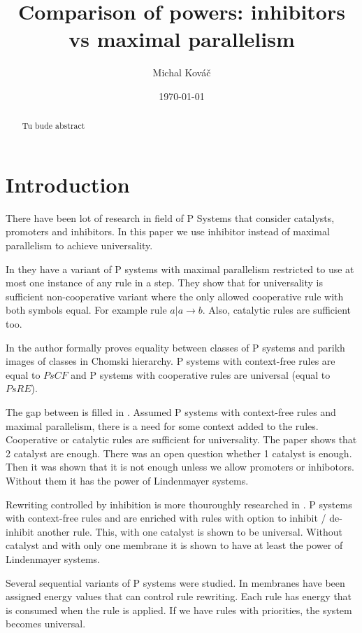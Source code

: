 \documentclass[a4paper,10pt]{article}
\begin{document}
\title{Comparison of powers: inhibitors vs maximal parallelism}
\author{Michal Kováč}
\date{\today}
\maketitle

\begin{abstract}
Tu bude abstract
\end{abstract}

\section{Introduction}
There have been lot of research in field of P Systems that consider catalysts, promoters and inhibitors. In this paper we use inhibitor instead of maximal parallelism to achieve universality.

In \cite{Ibarra04dang:the} they have a variant of P systems with maximal parallelism restricted to use at most one instance of any rule in a step.
They show that for universality is sufficient non-cooperative variant where the only allowed cooperative rule with both symbols equal. For example rule $a|a\rightarrow b$. Also, catalytic rules are sufficient too.

In \cite{Sburlan05dragos} the author formally proves equality between classes of P systems and parikh images of classes in Chomski hierarchy. P systems with context-free rules are equal to $PsCF$ and P systems with cooperative rules are universal (equal to $PsRE$).

The gap between is filled in \cite{Ionescu:jucs_10_5:on_p_systems_with}. Assumed P systems with context-free rules and maximal parallelism, there is a need for some context added to the rules. Cooperative or catalytic rules are sufficient for universality. The paper shows that 2 catalyst are enough. There was an open question whether 1 catalyst is enough. Then it was shown that it is not enough unless we allow promoters or inhibotors. Without them it has the power of Lindenmayer systems.

Rewriting controlled by inhibition is more thouroughly researched in \cite{Cavaliere:2004:IRP:2144633.2144648}. P systems with context-free rules and are enriched with rules with option to inhibit / de-inhibit another rule. This, with one catalyst is shown to be universal. Without catalyst and with only one membrane it is shown to have at least the power of Lindenmayer systems.

Several sequential variants of P systems were studied. In \cite{Freund:2004:SPS:2149813.2149831} membranes have been assigned energy values that can control rule rewriting. Each rule has energy that is consumed when the rule is applied. If we have rules with priorities, the system becomes universal.
\end{document}
